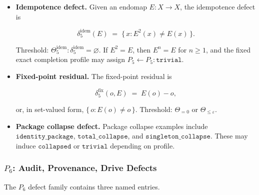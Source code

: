 \documentclass[11pt]{article}
\theoremstyle{definition}
\begin{document}
\begin{itemize}
\item
  \textbf{Idempotence defect.} Given an endomap \(E:X\to X\), the idempotence defect is

  \[
  \delta_5^{\mathrm{idem}}(E)\;=\;\{\,x:E^2(x)\neq E(x)\,\}.
  \]

  Threshold: \(\Theta_5^{\mathrm{idem}}:\delta_5^{\mathrm{idem}}=\varnothing\). If \(E^2=E\), then \(E^n=E\) for \(n\ge1\), and the fixed exact completion profile may assign \(P_5\leftarrow P_5:\texttt{trivial}\).
\item
  \textbf{Fixed-point residual.} The fixed-point residual is

  \[
  \delta_5^{\mathrm{fix}}(o,E)\;=\;E(o)-o,
  \]

  or, in set-valued form, \(\{\,o:E(o)\neq o\,\}\). Threshold: \(\Theta_{=0}\) or \(\Theta_{\le\varepsilon}\).
\item
  \textbf{Package collapse defect.} Package collapse examples include \(\texttt{identity\_package}\), \(\texttt{total\_collapse}\), and \(\texttt{singleton\_collapse}\). These may induce \(\texttt{collapsed}\) or \(\texttt{trivial}\) depending on profile.
\end{itemize}

\subsubsection{\texorpdfstring{\(P_6\): Audit, Provenance, Drive Defects}{P\_6: Audit, Provenance, Drive Defects}}

The \(P_6\) defect family contains three named entries.
\end{document}
